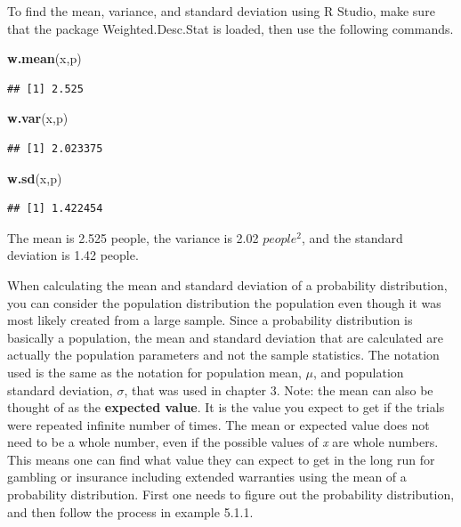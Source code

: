 \documentclass[
]{book}
\newenvironment{Shaded}{\begin{snugshade}}{\end{snugshade}}
\newcommand{\KeywordTok}[1]{\textcolor[rgb]{0.13,0.29,0.53}{\textbf{#1}}}
\newcommand{\NormalTok}[1]{#1}
\begin{document}
To find the mean, variance, and standard deviation using R Studio, make sure that the package Weighted.Desc.Stat is loaded, then use the following commands.

\begin{Shaded}
\begin{Highlighting}[]
\KeywordTok{w.mean}\NormalTok{(x,p)}
\end{Highlighting}
\end{Shaded}

\begin{verbatim}
## [1] 2.525
\end{verbatim}

\begin{Shaded}
\begin{Highlighting}[]
\KeywordTok{w.var}\NormalTok{(x,p)}
\end{Highlighting}
\end{Shaded}

\begin{verbatim}
## [1] 2.023375
\end{verbatim}

\begin{Shaded}
\begin{Highlighting}[]
\KeywordTok{w.sd}\NormalTok{(x,p)}
\end{Highlighting}
\end{Shaded}

\begin{verbatim}
## [1] 1.422454
\end{verbatim}

The mean is 2.525 people, the variance is 2.02 \(people^2\), and the standard deviation is 1.42 people.

When calculating the mean and standard deviation of a probability distribution, you can consider the population distribution the population even though it was most likely created from a large sample. Since a probability distribution is basically a population, the mean and standard deviation that are calculated are actually the population parameters and not the sample statistics. The notation used is the same as the notation for population mean, \(\mu\), and population standard deviation, \(\sigma\), that was used in chapter 3. Note: the mean can also be thought of as the \textbf{expected value}. It is the value you expect to get if the trials were repeated infinite number of times. The mean or expected value does not need to be a whole number, even if the possible values of \emph{x} are whole numbers. This means one can find what value they can expect to get in the long run for gambling or insurance including extended warranties using the mean of a probability distribution. First one needs to figure out the probability distribution, and then follow the process in example 5.1.1.
\end{document}
